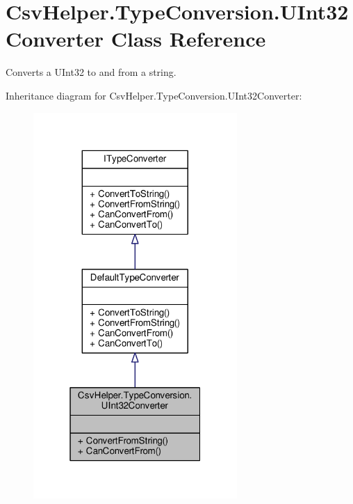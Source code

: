 \hypertarget{a00185}{\section{Csv\-Helper.\-Type\-Conversion.\-U\-Int32\-Converter Class Reference}
\label{a00185}
}


Converts a U\-Int32 to and from a string.  




Inheritance diagram for Csv\-Helper.\-Type\-Conversion.\-U\-Int32\-Converter\-:
\nopagebreak
\begin{figure}[H]
\begin{center}
\leavevmode
\includegraphics[width=220pt]{a00584}
\end{center}
\end{figure}


